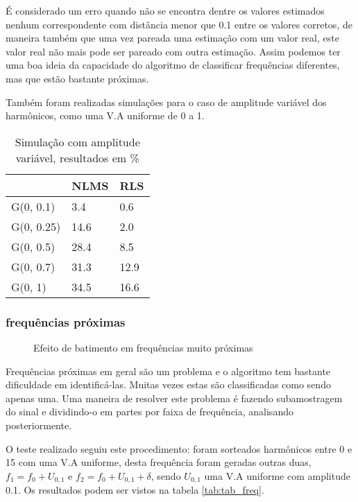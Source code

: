 \indent É considerado um erro quando não se encontra dentre os valores estimados nenhum correspondente com distância menor que 0.1 entre os valores corretos, de maneira também que uma vez pareada uma estimação com um valor real, este valor real não mais pode ser pareado com outra estimação. Assim podemos ter uma boa ideia da capacidade do algoritmo de classificar frequências diferentes, mas que estão bastante próximas.

\indent Também foram realizadas simulações para o caso de amplitude variável dos harmônicos, como uma V.A uniforme de 0 a 1.

\begin{table}[H]
	\centering
	\begin{tabular}{l|l|l}
		& NLMS & RLS \\
		\hline 
		G(0, 0.1)  & 3.4    & 0.6 \\
		G(0, 0.25) & 14.6   & 2.0  \\
		G(0, 0.5)  & 28.4  & 8.5  \\
		G(0, 0.7)  & 31.3  & 12.9  \\
		G(0, 1)    & 34.5  & 16.6 \\ 
	\end{tabular}
\caption{Simulação com amplitude variável, resultados em \%}
\end{table}

\subsubsection{frequências próximas}

\begin{figure}[h]
	\centering    
	\def\svgwidth{\columnwidth}
	
	\caption{Efeito de batimento em frequências muito próximas}
	\label{fig:your image label}
\end{figure}

\indent Frequências próximas em geral são um problema e o algoritmo tem bastante dificuldade em identificá-las. Muitas vezes estas são classificadas como sendo apenas uma. Uma maneira de resolver este problema é fazendo subamostragem do sinal e dividindo-o em partes por faixa de frequência, analisando posteriormente.

\indent O teste realizado seguiu este procedimento: foram sorteados harmônicos entre 0 e 15 com uma V.A uniforme, desta frequência foram geradas outras duas, $f_1=f_0+U_{0,1}$ e $f_2=f_0+U_{0,1}+\delta$, sendo $U_{0,1}$ uma V.A uniforme com amplitude 0.1. Os resultados podem ser vistos na tabela \ref{tab:tab_freq}.

